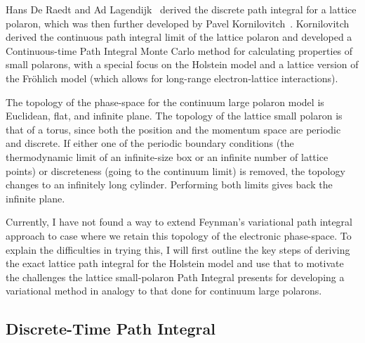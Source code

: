 Hans De Raedt and Ad Lagendijk~\cite{de_raedt_numerical_1983, de_raedt_monte_1985} derived the discrete path integral for a lattice polaron, which was then further developed by Pavel Kornilovitch~\cite{kornilovitch_polaron_1997, kornilovitch_continuous-time_1998, kornilovitch_ground-state_1999, kornilovitch_giant_1999, kornilovitch_band_2000, kornilovitch_feynmans_2004, kornilovitch_path_2007}. Kornilovitch derived the continuous path integral limit of the lattice polaron and developed a Continuous-time Path Integral Monte Carlo method for calculating properties of small polarons, with a special focus on the Holstein model and a lattice version of the Fr\"ohlich model (which allows for long-range electron-lattice interactions).
\newline 

The topology of the phase-space for the continuum large polaron model is Euclidean, flat, and infinite plane. The topology of the lattice small polaron is that of a torus, since both the position and the momentum space are periodic and discrete. If either one of the periodic boundary conditions (the thermodynamic limit of an infinite-size box or an infinite number of lattice points) or discreteness (going to the continuum limit) is removed, the topology changes to an infinitely long cylinder. Performing both limits gives back the infinite plane.
\newline 

Currently, I have not found a way to extend Feynman's variational path integral approach to case where we retain this topology of the electronic phase-space. To explain the difficulties in trying this, I will first outline the key steps of deriving the exact lattice path integral for the Holstein model and use that to motivate the challenges the lattice small-polaron Path Integral presents for developing a variational method in analogy to that done for continuum large polarons.

\subsection{Discrete-Time Path Integral}
\label{subsec:3-2-1}

